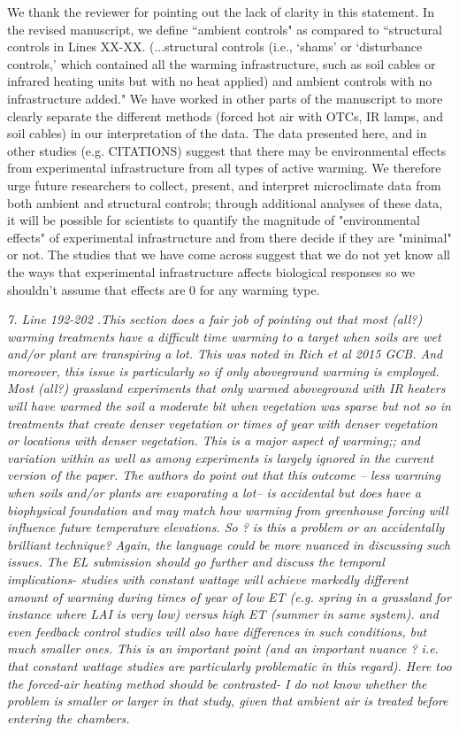 \documentclass[11pt,a4paper]{letter}
\begin{document}
\begin{letter}{}
We thank the reviewer for pointing out the lack of clarity in this statement. In the revised manuscript, we define ``ambient controls" as compared to ``structural controls in Lines XX-XX. (...structural controls (i.e., `shams' or `disturbance controls,' which contained all the warming infrastructure, such as soil cables or infrared heating units but with no heat applied) and ambient controls with no infrastructure added." We have worked in other parts of the manuscript to more clearly separate the different methods (forced hot air with OTCs, IR lamps, and soil cables) in our interpretation of the data. The data presented here, and in other studies (e.g. CITATIONS) suggest that there may be environmental effects from experimental infrastructure from all types of active warming. We therefore urge future researchers to collect, present, and interpret microclimate data from both ambient and structural controls; through additional analyses of these data, it will be possible for scientists to quantify the magnitude of "environmental effects" of experimental infrastructure and from there decide if they are "minimal" or not. The studies that we have come across suggest that we do not yet know all the ways that experimental infrastructure affects biological responses so we shouldn't assume that effects are 0 for any warming type. 

\emph{7. Line 192-202 .This section does a fair job of pointing out that most (all?) warming treatments have a difficult time warming to a target when soils are wet and/or plant are transpiring a lot. This was noted in Rich et al 2015 GCB. And moreover, this issue is particularly so if only aboveground warming is employed. Most (all?) grassland experiments that only warmed aboveground with IR heaters will have warmed the soil a moderate bit when vegetation was sparse but not so in treatments that create denser vegetation or times of year with denser vegetation or locations with denser vegetation. This is a major aspect of warming;; and variation within as well as among experiments is largely ignored in the current version of the paper. The authors do point out that this outcome -- less warming when soils and/or plants are evaporating a lot-- is accidental but does have a biophysical foundation and may match how warming from greenhouse forcing will influence future temperature elevations. So ? is this a problem or an accidentally brilliant technique? Again, the language could be more nuanced in discussing such issues. The EL submission should go further and discuss the temporal
implications- studies with constant wattage will achieve markedly different amount of warming
during times of year of low ET (e.g. spring in a grassland for instance where LAI is very low)
versus high ET (summer in same system). and even feedback control studies will also have
differences in such conditions, but much smaller ones. This is an important point (and an
important nuance ? i.e. that constant wattage studies are particularly problematic in this
regard). Here too the forced-air heating method should be contrasted- I do not know whether
the problem is smaller or larger in that study, given that ambient air is treated before entering
the chambers.}



\end{letter}
\end{document}
